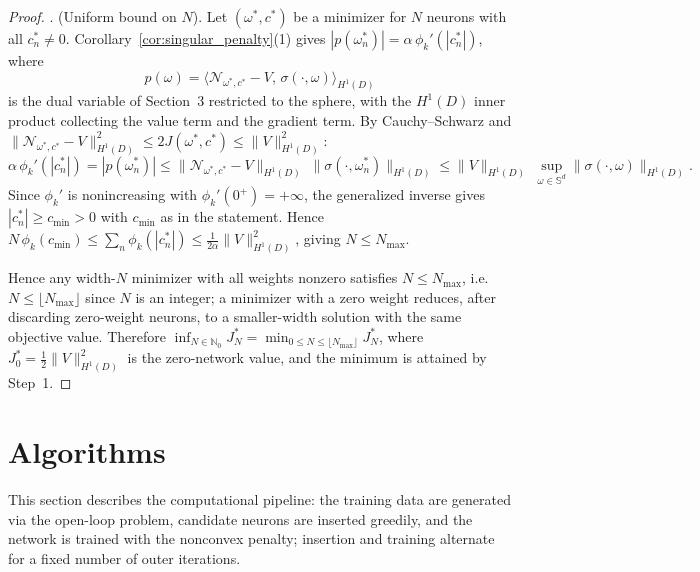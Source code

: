 \documentclass[11pt]{amsart}
\theoremstyle{definition}
\theoremstyle{remark}
\begin{document}
\begin{proof}
\medskip{}. (Uniform bound on $N$).
Let $(\omega^*, c^*)$ be a minimizer for $N$ neurons with all $c_n^* \neq 0$. Corollary~\ref{cor:singular_penalty}(1) gives $|p(\omega_n^*)| = \alpha\,\phi_k'(|c_n^*|)$, where
\begin{equation*}
	p(\omega) = \langle \mathcal{N}_{\omega^*, c^*} - V,\, \sigma(\cdot, \omega)\rangle_{H^1(D)}
\end{equation*}
is the dual variable of Section~3 restricted to the sphere, with the $H^1(D)$ inner product collecting the value term and the gradient term.
By Cauchy--Schwarz and $\|\mathcal{N}_{\omega^*, c^*} - V\|_{H^1(D)}^2 \le 2 J(\omega^*, c^*) \le \|V\|_{H^1(D)}^2$:
\begin{equation*}
	\alpha\,\phi_k'(|c_n^*|) = |p(\omega_n^*)| \le \|\mathcal{N}_{\omega^*, c^*} - V\|_{H^1(D)} \;\|\sigma(\cdot, \omega_n^*)\|_{H^1(D)} \le \|V\|_{H^1(D)}\;\sup_{\omega \in \mathbb{S}^d}\|\sigma(\cdot, \omega)\|_{H^1(D)}.
\end{equation*}
Since $\phi_k'$ is nonincreasing with $\phi_k'(0^+) = +\infty$, the generalized inverse gives $|c_n^*| \ge c_{\min} > 0$ with $c_{\min}$ as in the statement.
Hence $N\,\phi_k(c_{\min}) \le \sum_n \phi_k(|c_n^*|) \le \frac{1}{2\alpha}\|V\|_{H^1(D)}^2$, giving $N \le N_{\max}$.

Hence any width-$N$ minimizer with all weights nonzero satisfies
$N \le N_{\max}$, i.e.\ $N \le \lfloor N_{\max} \rfloor$ since $N$ is an
integer; a minimizer with a zero weight reduces, after discarding zero-weight
neurons, to a smaller-width solution with the same objective value.
Therefore $\inf_{N \in \mathbb{N}_0} J_N^* = \min_{0 \le N \le \lfloor N_{\max} \rfloor} J_N^*$,
where $J_0^* = \frac{1}{2}\|V\|_{H^1(D)}^2$ is the zero-network value, and the
minimum is attained by Step~1.
\end{proof}



\section{Algorithms}
This section describes the computational pipeline: the training data are generated via the open-loop problem, candidate neurons are inserted greedily, and the network is trained with the nonconvex penalty; insertion and training alternate for a fixed number of outer iterations. 
\end{document}
